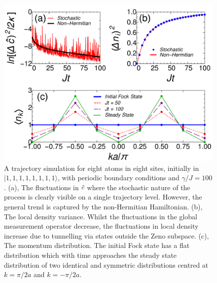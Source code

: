 \begin{figure}[hbtp!]
	\includegraphics[width=\linewidth]{steady}
	\caption[Non-Hermitian Steady State]{A trajectory simulation
          for eight atoms in eight sites, initially in
          $|1,1,1,1,1,1,1,1 \rangle$, with periodic boundary
          conditions and $\gamma/J = 100$. (a), The fluctuations in
          $\hat{c}$ where the stochastic nature of the process is clearly
          visible on a single trajectory level. However, the general
          trend is captured by the non-Hermitian Hamiltonian. (b), The
          local density variance. Whilst the fluctuations in the
          global measurement operator decrease, the fluctuations in
          local density increase due to tunnelling via states outside
          the Zeno subspace. (c), The momentum distribution. The
          initial Fock state has a flat distribution which with time
          approaches the steady state distribution of two identical
          and symmetric distributions centred at $k = \pi/2a$ and
          $k = -\pi/2a$.\label{fig:steady}}
\end{figure}

